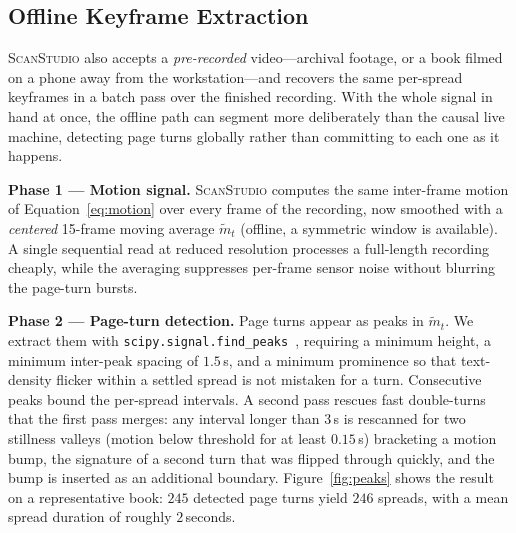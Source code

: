 \documentclass{article}
\newcommand{\sys}{\textsc{ScanStudio}\xspace}
\begin{document}

\subsection{Offline Keyframe Extraction}
\label{sec:offline}

\sys also accepts a \emph{pre-recorded} video---archival footage, or a book
filmed on a phone away from the workstation---and recovers the same per-spread
keyframes in a batch pass over the finished recording. With the whole signal in
hand at once, the offline path can segment more deliberately than the causal live
machine, detecting page turns globally rather than committing to each one as it
happens.

\noindent\textbf{Phase 1 --- Motion signal.}
\sys computes the same inter-frame motion of Equation~\ref{eq:motion} over every
frame of the recording, now smoothed with a \emph{centered} 15-frame moving
average $\tilde{m}_t$ (offline, a symmetric window is available). A single
sequential read at reduced resolution processes a full-length recording cheaply,
while the averaging suppresses per-frame sensor noise without blurring the
page-turn bursts.

\noindent\textbf{Phase 2 --- Page-turn detection.}
Page turns appear as peaks in $\tilde{m}_t$. We extract them with
\texttt{scipy.signal.find\_peaks}~\cite{virtanen2020scipy}, requiring a minimum
height, a minimum inter-peak spacing of $1.5$\,s, and a minimum prominence so
that text-density flicker within a settled spread is not mistaken for a turn.
Consecutive peaks bound the per-spread intervals. A second pass rescues fast
double-turns that the first pass merges: any interval longer than $3$\,s is
rescanned for two stillness valleys (motion below threshold for at least
$0.15$\,s) bracketing a motion bump, the signature of a second turn that was
flipped through quickly, and the bump is inserted as an additional boundary.
Figure~\ref{fig:peaks} shows the result on a representative book: $245$ detected
page turns yield $246$ spreads, with a mean spread duration of roughly
$2$\,seconds.
\end{document}
